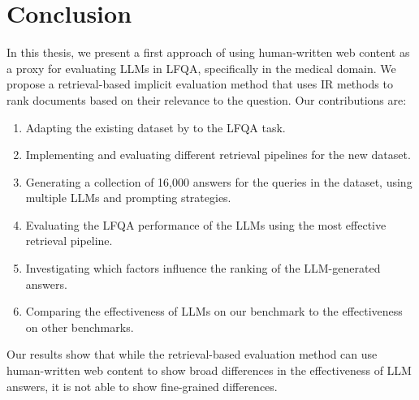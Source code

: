 \section{Conclusion}
In this thesis, we present a first approach of using human-written web content as a proxy for evaluating LLMs in LFQA, specifically in the medical domain.
We propose a retrieval-based implicit evaluation method that uses IR methods to rank documents based on their relevance to the question.
Our contributions are:
\begin{enumerate}
    \item Adapting the existing dataset by \cite{goeuriot:2021:Consumer} to the LFQA task.
    \item Implementing and evaluating different retrieval pipelines for the new dataset.
    \item Generating a collection of 16,000 answers for the queries in the dataset, using multiple LLMs and prompting strategies.
    \item Evaluating the LFQA performance of the LLMs using the most effective retrieval pipeline.
    \item Investigating which factors influence the ranking of the LLM-generated answers.
    \item Comparing the effectiveness of LLMs on our benchmark to the effectiveness on other benchmarks.
\end{enumerate}

Our results show that while the retrieval-based evaluation method can use human-written web content to show broad differences in the effectiveness of LLM answers, it is not able to show fine-grained differences.